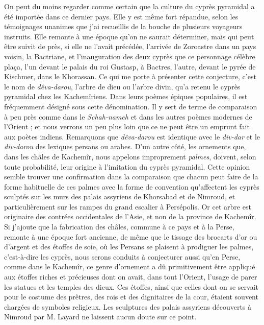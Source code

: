 \documentclass{article}
\begin{document}
On peut du moins regarder comme certain que la culture du cyprès pyramidal a été importée dans ce dernier pays. Elle y est même fort répandue, selon les témoignages unanimes que j'ai recueillis de la bouche de plusieurs voyageurs instruits. Elle remonte à une époque qu'on ne saurait déterminer, mais qui peut être suivit de près, si elle ne l'avait précédée, l'arrivée de Zoroastre dans un pays voisin, la Bactriane, et l'inauguration des deux cyprès que ce personnage célèbre plaça, l'un devant le palais du roi Gustasp, à Bactres, l'autre, devant le pyrée de Kischmer, dans le Khorassan. Ce qui me porte à présenter cette conjecture, c'est le nom de \emph{dêva-darou}, l'arbre de dieu ou l'arbre divin, qu'a retenu le cyprès pyramidal chez les Kachemîriens. Dans leurs poèmes épiques populaires, il est fréquemment désigné sous cette dénomination. Il y sert de terme de comparaison à peu près comme dans le \emph{Schah-nameh} et dans les autres poèmes modernes de l'Orient ; et nous verrons un peu plus loin que ce ne peut être un emprunt fait aux poètes indiens. Remarquons que \emph{dêva-darou} est identique avec le \emph{div-dar} et le \emph{div-darou} des lexiques persans ou arabes. D'un autre côté, les ornements que, dans les châles de Kachemîr, nous appelons improprement \emph{palmes}, doivent, selon toute probabilité, leur origine à l'imitation du cyprès pyramidal. Cette opinion semble trouver une confirmation dans la comparaison que chacun peut faire de la forme habituelle de ces palmes avec la forme de convention qu'affectent les cyprès sculptés sur les murs des palais assyriens de Khorsabad et de Nimroud, et particulièrement sur les rampes du grand escalier à Persépolis. Or cet arbre est originaire des contrées occidentales de l'Asie, et non de la province de Kachemîr. Si j'ajoute que la fabrication des châles, commune à ce pays et à la Perse, remonte à une époque fort ancienne, de même que le tissage des brocarts d'or ou d'argent et des étoffes de soie, où les Persans se plaisent à prodiguer les palmes, c'est-à-dire les cyprès, nous serons conduits à conjecturer aussi qu'en Perse, comme dans le Kachemîr, ce genre d'ornement a dû primitivement être appliqué aux étoffes riches et précieuses dont on avait, dans tout l'Orient, l'usage de parer les statues et les temples des dieux. Ces étoffes, ainsi que celles dont on se servait pour le costume des prêtres, des rois et des dignitaires de la cour, étaient souvent chargées de symboles religieux. Les sculptures des palais assyriens découverts à Nimroud par M. Layard ne laissent aucun doute sur ce point.
\end{document}
